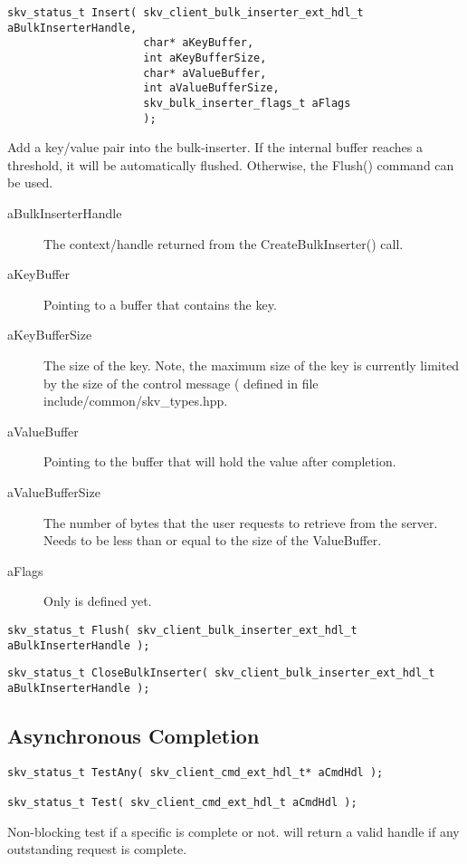 \begin{lstlisting}
skv_status_t Insert( skv_client_bulk_inserter_ext_hdl_t aBulkInserterHandle,
                     char* aKeyBuffer,
                     int aKeyBufferSize,
                     char* aValueBuffer,
                     int aValueBufferSize,
                     skv_bulk_inserter_flags_t aFlags
                     );
\end{lstlisting}
Add a key/value pair into the bulk-inserter.  If the internal buffer
reaches a threshold, it will be automatically flushed. Otherwise, the
Flush() command can be used.
\begin{description}
\item[aBulkInserterHandle] The context/handle returned from the
  CreateBulkInserter() call.
\item[aKeyBuffer] Pointing to a buffer that contains the key.
\item[aKeyBufferSize] The size of the key.  Note, the maximum size of
  the key is currently limited by the size of the control message
  ( defined in file
  include/common/skv\_types.hpp.
\item[aValueBuffer] Pointing to the buffer that will hold the value
  after completion.
\item[aValueBufferSize] The number of bytes that the user requests to
  retrieve from the server.  Needs to be less than or equal to the
  size of the ValueBuffer.
\item[aFlags] Only  is
  defined yet.
\end{description}

\begin{lstlisting}
skv_status_t Flush( skv_client_bulk_inserter_ext_hdl_t aBulkInserterHandle );
\end{lstlisting}
\begin{lstlisting}
skv_status_t CloseBulkInserter( skv_client_bulk_inserter_ext_hdl_t aBulkInserterHandle );
\end{lstlisting}

  
\subsection{Asynchronous Completion}\label{sec:api:async}
\begin{lstlisting}
skv_status_t TestAny( skv_client_cmd_ext_hdl_t* aCmdHdl );

skv_status_t Test( skv_client_cmd_ext_hdl_t aCmdHdl );
\end{lstlisting}
Non-blocking test if a specific  is complete or not.
 will return a valid handle if any outstanding request
is complete.

